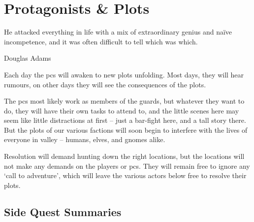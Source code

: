\chapter{Protagonists \& Plots}
  \epigraph{He attacked everything in life with a mix of extraordinary genius and na\"ive incompetence, and it was often difficult to tell which was which.}{Douglas Adams}
\label{sideQuestIntro}

\noindent
Each day the \glspl{pc} will awaken to new plots unfolding.
Most days, they will hear rumours, on other days they will see the consequences of the plots.

The \glspl{pc} most likely work as members of the \glspl{guard}, but whatever they want to do, they will have their own tasks to attend to, and the little scenes here may seem like little distractions at first -- just a bar-fight here, and a tall story there.
But the plots of our various factions will soon begin to interfere with the lives of everyone in \gls{valley} -- humans, elves, and gnomes alike.

Resolution will demand hunting down the right locations, but the locations will not make any demands on the players or \glspl{pc}.
They will remain free to ignore any `call to adventure', which will leave the various actors below free to resolve their plots.

\printglossary[
  type=people,
  style=mcolindex,
]

\label{Irina/greylands}

\section{Side Quest Summaries}
\label{sqSummaries}

